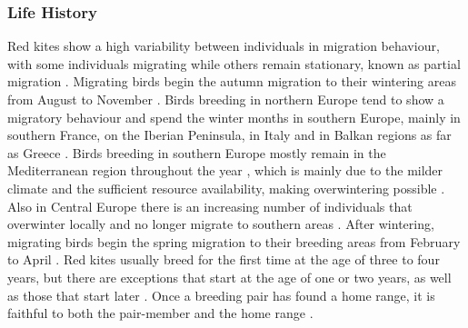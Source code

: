 \subsubsection{Life History}
Red kites show a high variability between individuals in migration behaviour, with some individuals migrating while others remain stationary, known as partial migration \parencite{garcia2022seasonal, jaffre2013long}. Migrating birds begin the autumn migration to their wintering areas from August to November \parencite{aebischer2021rotmilan, garcia2022seasonal, pfeiffer2009satelliten}. Birds breeding in northern Europe tend to show a migratory behaviour and spend the winter months in southern Europe, mainly in southern France, on the Iberian Peninsula, in Italy and in Balkan regions as far as Greece \parencite{ferreira2015wintering, garcia2022seasonal, maciorowski2019autumn, mougeot2011breeding, panter2022age}. Birds breeding in southern Europe mostly remain in the Mediterranean region throughout the year \parencite{crespo2020analysis}, which is mainly due to the milder climate and the sufficient resource availability, making overwintering possible \parencite{garcia1998geographic}. Also in Central Europe there is an increasing number of individuals that overwinter locally and no longer migrate to southern areas \parencite{aebischer2021rotmilan}. After wintering, migrating birds begin the spring migration to their breeding areas from February to April \parencite{aebischer2021rotmilan, garcia2022seasonal, pfeiffer2009satelliten}. Red kites usually breed for the first time at the age of three to four years, but there are exceptions that start at the age of one or two years, as well as those that start later \parencite{mougeot2011breeding}. Once a breeding pair has found a home range, it is faithful to both the pair-member and the home range \parencite{aebischer2021rotmilan, mougeot2011breeding, scherler2023brutbiologie}.

